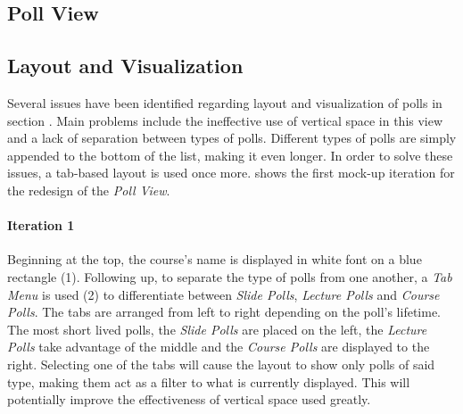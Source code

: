 \subsection{Poll View}

\subsection{Layout and Visualization}
Several issues have been identified regarding layout and visualization of polls in section . Main problems include the ineffective use of vertical space in this view and a lack of separation between types of polls. Different types of polls are simply appended to the bottom of the list, making it even longer.
In order to solve these issues, a tab-based layout is used once more. 
  shows the first mock-up iteration for the redesign of the \emph{Poll View}.
\paragraph{Iteration 1}
Beginning at the top, the course's name is displayed in white font on a blue rectangle (1). Following up, to separate the type of polls from one another, a \emph{Tab Menu} is used (2) to differentiate between \emph{Slide Polls}, \emph{Lecture Polls} and \emph{Course Polls}. The tabs are arranged from left to right depending on the poll's lifetime. The most short lived polls, the \emph{Slide Polls} are placed on the left, the \emph{Lecture Polls} take advantage of the middle and the \emph{Course Polls} are displayed to the right. Selecting one of the tabs will cause the layout to show only polls of said type, making them act as a filter to what is currently displayed. This will potentially improve the effectiveness of vertical space used greatly. 

